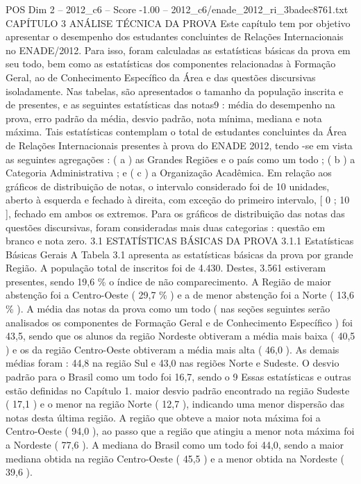 \begin{textsample}{POS Dim 2 – 2012\_c6 – Score -1.00 – 2012\_c6/enade\_2012\_ri\_3badec8761.txt}  \label{ex:f2_pos_246}
CAPÍTULO 3 ANÁLISE TÉCNICA DA PROVA Este capítulo tem por objetivo apresentar o desempenho dos estudantes concluintes de Relações Internacionais no ENADE/2012.
Para isso, foram calculadas as estatísticas básicas da prova em seu todo, bem como as estatísticas dos componentes relacionadas à Formação Geral, ao de Conhecimento Específico da Área e das questões discursivas isoladamente.
Nas tabelas, são apresentados o tamanho da população inscrita e de presentes, e as seguintes estatísticas das notas9 : média do desempenho na prova, erro padrão da média, desvio padrão, nota mínima, mediana e nota máxima.
Tais estatísticas contemplam o total de estudantes concluintes da Área de Relações Internacionais presentes à prova do ENADE 2012, tendo -se em vista as seguintes agregações : ( a ) as Grandes Regiões e o país como um todo ; ( b ) a Categoria Administrativa ; e ( c ) a Organização Acadêmica.
Em relação aos gráficos de distribuição de notas, o intervalo considerado foi de 10 unidades, aberto à esquerda e fechado à direita, com exceção do primeiro intervalo, [ 0 ; 10 ], fechado em ambos os extremos.
Para os gráficos de distribuição das notas das questões discursivas, foram consideradas mais duas categorias : questão em branco e nota zero. 3.1 ESTATÍSTICAS BÁSICAS DA PROVA 3.1.1 Estatísticas Básicas Gerais A Tabela 3.1 apresenta as estatísticas básicas da prova por grande Região.
A população total de inscritos foi de 4.430.
Destes, 3.561 estiveram presentes, sendo 19,6 \% o índice de não comparecimento.
A Região de maior abstenção foi a Centro-Oeste ( 29,7 \% ) e a de menor abstenção foi a Norte ( 13,6 \% ).
A média das notas da prova como um todo ( nas seções seguintes serão analisados os componentes de Formação Geral e de Conhecimento Específico ) foi 43,5, sendo que os alunos da região Nordeste obtiveram a média mais baixa ( 40,5 ) e os da região Centro-Oeste obtiveram a média mais alta ( 46,0 ).
As demais médias foram : 44,8 na região Sul e 43,0 nas regiões Norte e Sudeste.
O desvio padrão para o Brasil como um todo foi 16,7, sendo o 9 Essas estatísticas e outras estão definidas no Capítulo 1. maior desvio padrão encontrado na região Sudeste ( 17,1 ) e o menor na região Norte ( 12,7 ), indicando uma menor dispersão das notas desta última região.
A região que obteve a maior nota máxima foi a Centro-Oeste ( 94,0 ), ao passo que a região que atingiu a menor nota máxima foi a Nordeste ( 77,6 ).
A mediana do Brasil como um todo foi 44,0, sendo a maior mediana obtida na região Centro-Oeste ( 45,5 ) e a menor obtida na Nordeste ( 39,6 ).

\end{textsample}
